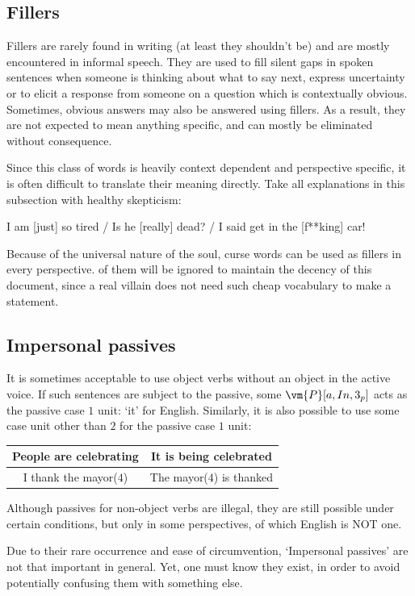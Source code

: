 \subsection{Fillers}
Fillers are rarely found in writing (at least they shouldn't be) and are mostly encountered in informal speech. They are used to fill silent gaps in spoken sentences when someone is thinking about what to say next, express uncertainty or to elicit a response from someone on a question which is contextually obvious. Sometimes, obvious answers may also be answered using fillers. As a result, they are not expected to mean anything specific, and can mostly be eliminated without consequence.

Since this class of words is heavily context dependent and perspective specific, it is often difficult to translate their meaning directly. Take all explanations in this subsection with healthy skepticism:
\begin{example}
        I am [just] so tired / Is he [really] dead? / I said get in the [f**king] car!
\end{example}
Because of the universal nature of the soul,  curse words can be used as fillers in every perspective.  of them will be ignored to maintain the decency of this document, since a real villain does not need such cheap vocabulary to make a statement.
\subsection{Impersonal passives}
It is sometimes acceptable to use object verbs without an object in the active voice. If such sentences are subject to the passive, some $\vm{P}[a,In,3_p]$ acts as the passive case $1$ unit:  `it' for English. Similarly, it is also possible to use some case unit other than $2$ for the passive case $1$ unit:
\begin{example}
    \begin{tabular}{c|c}
        People are celebrating & It is being celebrated\\\hline I thank the mayor($4$) & The mayor($4$) is thanked
    \end{tabular}
\end{example}
Although passives for non-object verbs are illegal, they are still possible under certain conditions, but only in some perspectives, of which English is NOT one.

Due to their rare occurrence and ease of circumvention, `Impersonal passives' are not that important in general. Yet, one must  know they exist, in order to avoid potentially confusing them with something else.
